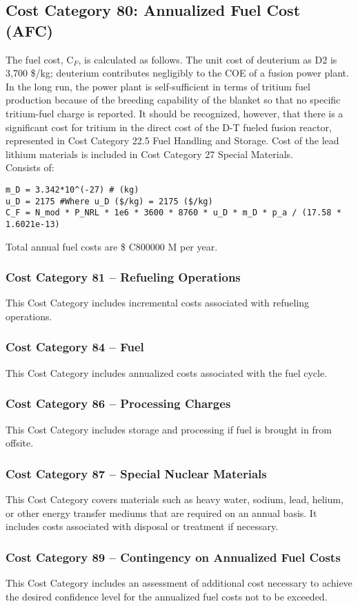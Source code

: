 \subsection{Cost Category 80: Annualized Fuel Cost (AFC)}

The fuel cost, C$_{F}$, is calculated as follows.  The unit cost of deuterium as D2 is 3,700 \$/kg; deuterium contributes negligibly to the COE of a fusion power plant. In the long run, the power plant is self-sufficient in terms of tritium fuel production because of the breeding capability of the blanket so that no specific tritium-fuel charge is reported. It should be recognized, however, that there is a significant cost for tritium in the direct cost of the D-T fueled fusion reactor, represented in Cost Category 22.5 Fuel Handling and Storage. Cost of the lead lithium materials is included in Cost Category 27 Special Materials.\\

Consists of:  
\begin{verbatim} 
m_D = 3.342*10^(-27) # (kg)
u_D = 2175 #Where u_D ($/kg) = 2175 ($/kg) 
C_F = N_mod * P_NRL * 1e6 * 3600 * 8760 * u_D * m_D * p_a / (17.58 * 1.6021e-13)
\end{verbatim} 

Total annual fuel costs are \$ C800000 M per year.

\subsubsection*{Cost Category 81 – Refueling Operations}
This Cost Category includes incremental costs associated with refueling operations.

\subsubsection*{Cost Category 84 – Fuel}
This Cost Category includes annualized costs associated with the fuel cycle.

\subsubsection*{Cost Category 86 – Processing Charges}
This Cost Category includes storage and processing if fuel is brought in from offsite.

\subsubsection*{Cost Category 87 – Special Nuclear Materials}
This Cost Category covers materials such as heavy water, sodium, lead, helium, or other energy transfer mediums that are required on an annual basis. It includes costs associated with disposal or treatment if necessary. 

\subsubsection*{Cost Category 89 – Contingency on Annualized Fuel Costs}
This Cost Category includes an assessment of additional cost necessary to achieve the desired confidence level for the annualized fuel costs not to be exceeded.
